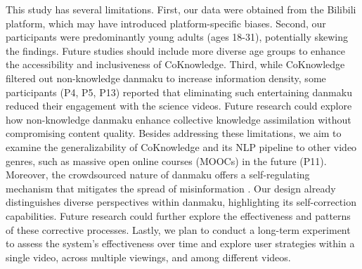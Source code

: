 This study has several limitations. 
First, our data were obtained from the Bilibili platform, which may have introduced platform-specific biases. 
Second, our participants were predominantly young adults (ages 18-31), potentially skewing the findings. Future studies should include more diverse age groups to enhance the accessibility and inclusiveness of CoKnowledge. 
Third, while CoKnowledge filtered out non-knowledge danmaku to increase information density, some participants (P4, P5, P13) reported that eliminating such entertaining danmaku reduced their engagement with the science videos. Future research could explore how non-knowledge danmaku enhance collective knowledge assimilation without compromising content quality.
Besides addressing these limitations, we aim to examine the generalizability of CoKnowledge and its NLP pipeline to other video genres, such as massive open online courses (MOOCs) in the future (P11). 
Moreover, the crowdsourced nature of danmaku offers a self-regulating mechanism that mitigates the spread of misinformation \cite{he2021beyond}. Our design already distinguishes diverse perspectives within danmaku, highlighting its self-correction capabilities. Future research could further explore the effectiveness and patterns of these corrective processes.
Lastly, we plan to conduct a long-term experiment to assess the system's effectiveness over time and explore user strategies within a single video, across multiple viewings, and among different videos.
